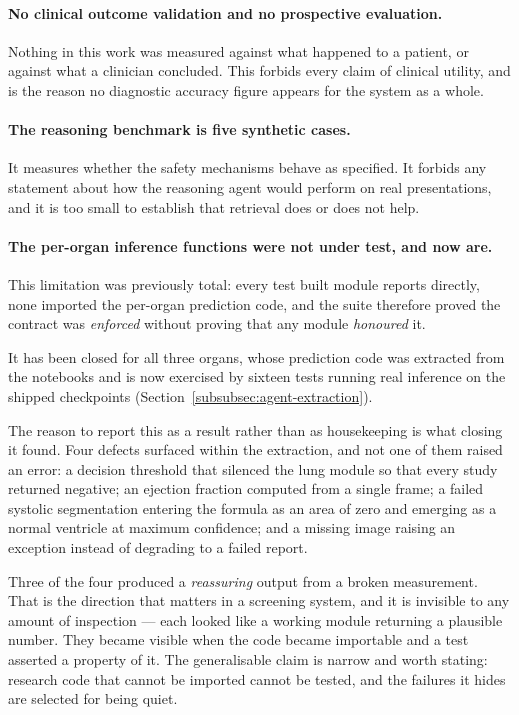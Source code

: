 \paragraph{No clinical outcome validation and no prospective evaluation.} Nothing in this
work was measured against what happened to a patient, or against what a clinician concluded.
This forbids every claim of clinical utility, and is the reason no diagnostic accuracy figure
appears for the system as a whole.

\paragraph{The reasoning benchmark is five synthetic cases.} It measures whether the safety
mechanisms behave as specified. It forbids any statement about how the reasoning agent would
perform on real presentations, and it is too small to establish that retrieval does or does
not help.

\paragraph{The per-organ inference functions were not under test, and now are.} This limitation
was previously total: every test built module reports directly, none imported the per-organ
prediction code, and the suite therefore proved the contract was \emph{enforced} without proving
that any module \emph{honoured} it.

It has been closed for all three organs, whose prediction code was extracted from the notebooks
and is now exercised by sixteen tests running real inference on the shipped checkpoints
(Section~\ref{subsubsec:agent-extraction}).

The reason to report this as a result rather than as housekeeping is what closing it found. Four
defects surfaced within the extraction, and not one of them raised an error: a decision threshold
that silenced the lung module so that every study returned negative; an ejection fraction
computed from a single frame; a failed systolic segmentation entering the formula as an area of
zero and emerging as a normal ventricle at maximum confidence; and a missing image raising an
exception instead of degrading to a failed report.

Three of the four produced a \emph{reassuring} output from a broken measurement. That is the
direction that matters in a screening system, and it is invisible to any amount of inspection ---
each looked like a working module returning a plausible number. They became visible when the code
became importable and a test asserted a property of it. The generalisable claim is narrow and
worth stating: research code that cannot be imported cannot be tested, and the failures it hides
are selected for being quiet.


